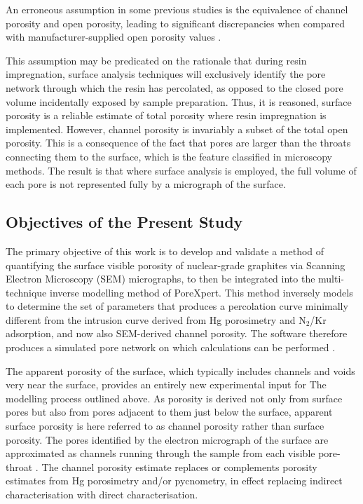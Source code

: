 \documentclass[review]{elsarticle}
\begin{document}
An erroneous assumption in some previous studies is the equivalence of channel
porosity and open porosity, leading to significant discrepancies when compared
with manufacturer-supplied open porosity values \cite{Kane2011a}. 

This assumption may be predicated on the rationale that during resin
impregnation, surface analysis techniques will exclusively identify the pore
network through which the resin has percolated, as opposed to the closed pore
volume incidentally exposed by sample preparation. Thus, it is reasoned, surface
porosity is a reliable estimate of total porosity where resin impregnation is
implemented. However, channel porosity is invariably a subset of the total open
porosity. This is a consequence of the fact that pores are larger than the
throats connecting them to the surface, which is the feature classified in
microscopy methods. The result is that where surface analysis is employed, the
full volume of each pore is not represented fully by a micrograph of the
surface.


\subsection{Objectives of the Present Study}

The primary objective of this work is to develop and validate a method of
quantifying the surface visible porosity of nuclear-grade graphites via Scanning
Electron Microscopy (SEM) micrographs, to then be integrated into the
multi-technique inverse modelling method of PoreXpert. This method inversely
models to determine the set of parameters that produces a percolation curve
minimally different from the intrusion curve derived from Hg porosimetry and
N$_2$/Kr adsorption, and now also SEM-derived channel porosity. The software
therefore produces a simulated pore network on which calculations can be
performed \citep{MatthewsPoreXpert2025}.


The apparent porosity of the surface, which typically includes channels and
voids very near the surface, provides an entirely new experimental input for The
modelling process outlined above. As porosity is derived not only from surface
pores but also from pores adjacent to them just below the surface, apparent
surface porosity is here referred to as channel porosity rather than surface
porosity. The pores identified by the electron micrograph of the surface  are
approximated as channels running through the sample from each visible
pore-throat \cite{MatthewsPoreXpert2025}. The channel porosity estimate replaces
or complements porosity estimates from Hg porosimetry and/or pycnometry, in
effect replacing indirect characterisation with direct characterisation.
\end{document}
